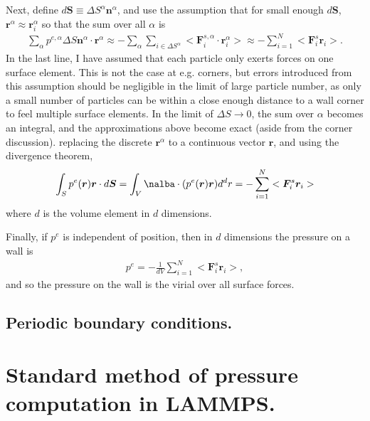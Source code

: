 \documentclass[twocolumn,amsmath,amssymb,aps]{revtex4-1}%
\begin{document}
Next, define $d\bm{S}\equiv\Delta S^{\alpha}\bm{n}^{\alpha}$,
and use the assumption that for small enough $d\bm{S}$,
$\bm{r}^{\alpha}\approx\bm{r}_i^{\alpha}$ so that the sum over
all $\alpha$ is
\begin{align}
  \sum_{\alpha}p^{e,\alpha}\Delta S\bm{n}^{\alpha}
  \cdot\bm{r}^{\alpha}
  \approx -\sum_{\alpha}\sum_{i\in\Delta S^{\alpha}}
  <\bm{F}_i^{s,\alpha}\cdot\bm{r}_i^{\alpha}>
  \approx-\sum_{i=1}^{N}<\bm{F}_i^{s}\bm{r}_i>.
\end{align}
In the last line, I have assumed that each particle only
exerts forces on one surface element. This is not the case
at e.g. corners, but errors introduced from this assumption
should be negligible in the limit of large particle number,
as only a small number of particles can be within a close
enough distance to a wall corner to feel multiple surface
elements. In the limit of $\Delta S\to 0$, the sum over
$\alpha$ becomes an integral, and the approximations above
become exact (aside from the corner discussion).
replacing the discrete $\bm{r}^{\alpha}$ to a continuous
vector $\bm{r}$, and using the divergence theorem,
\begin{align}
  \int_{S} p^e(\bm{r})\bm{r}\cdot d\bm{S}
  =\int_V\nalba\cdot(p^e(\bm{r})\bm{r})d^dr
  =-\sum_{i=1}^{N}<\bm{F}_i^{s}\bm{r}_i>
\end{align}
where $d$ is the volume element in $d$ dimensions.

Finally, if $p^e$ is independent of position, then in $d$
dimensions the pressure on a wall is
\begin{align}\label{eq:pwall}
  p^e
  =-\frac{1}{dV}\sum_{i=1}^{N}<\bm{F}_i^{s}\bm{r}_i>,
\end{align}
and so the pressure on the wall is the virial over all
surface forces.

\subsection{Periodic boundary conditions.}

\section{Standard method of pressure computation in LAMMPS.}
\end{document}
